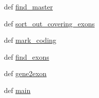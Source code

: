 \begin{DoxyCompactItemize}
\item 
def \hyperlink{namespace06__gene2exon__check_a12bc2c8e5727d37398c0e3a9c82e9c69}{find\-\_\-master}
\item 
def \hyperlink{namespace06__gene2exon__check_aec3d564faedf23dbc4e7075be83e32c8}{sort\-\_\-out\-\_\-covering\-\_\-exons}
\item 
def \hyperlink{namespace06__gene2exon__check_a929b9fe23b6f4a79ee5edabd3ebe6246}{mark\-\_\-coding}
\item 
def \hyperlink{namespace06__gene2exon__check_a5286beff9a776f6441a3e8fa5a368ab8}{find\-\_\-exons}
\item 
def \hyperlink{namespace06__gene2exon__check_a5af6761f6eabd1f3c706035dc51b72e2}{gene2exon}
\item 
def \hyperlink{namespace06__gene2exon__check_aaf3ed79ee70721686ea446a7a57f8a64}{main}
\end{DoxyCompactItemize}


